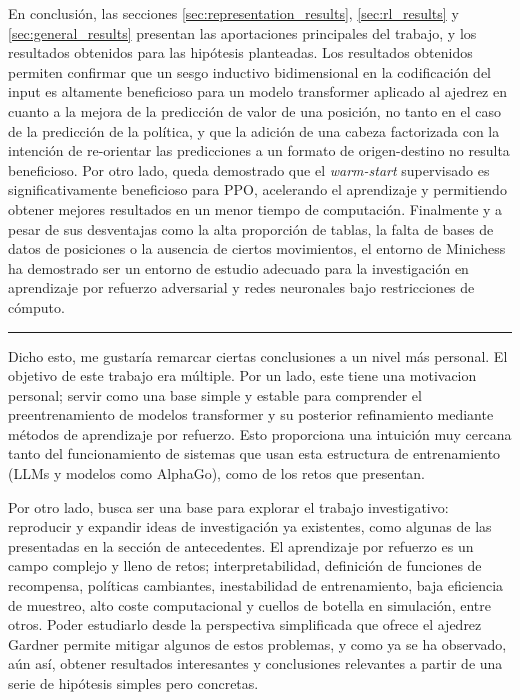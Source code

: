 \documentclass[12pt, a4paper]{article}
\begin{document}
En conclusión, las secciones \ref{sec:representation_results}, \ref{sec:rl_results} y \ref{sec:general_results} presentan las aportaciones principales del trabajo, y los resultados obtenidos para las hipótesis planteadas. Los resultados obtenidos permiten confirmar que un sesgo inductivo bidimensional en la codificación del input es altamente beneficioso para un modelo transformer aplicado al ajedrez en cuanto a la mejora de la predicción de valor de una posición, no tanto en el caso de la predicción de la política, y que la adición de una cabeza factorizada con la intención de re-orientar las predicciones a un formato de origen-destino no resulta beneficioso. Por otro lado, queda demostrado que el \textit{warm-start} supervisado es significativamente beneficioso para PPO, acelerando el aprendizaje y permitiendo obtener mejores resultados en un menor tiempo de computación. Finalmente y a pesar de sus desventajas como la alta proporción de tablas, la falta de bases de datos de posiciones o la ausencia de ciertos movimientos, el entorno de Minichess ha demostrado ser un entorno de estudio adecuado para la investigación en aprendizaje por refuerzo adversarial y redes neuronales bajo restricciones de cómputo. 

\rule{\textwidth}{0.2pt}

Dicho esto, me gustaría remarcar ciertas conclusiones a un nivel más personal. El objetivo de este trabajo era múltiple. Por un lado, este tiene una motivacion personal; servir como una base simple y estable para comprender el preentrenamiento de modelos transformer y su posterior refinamiento mediante métodos de aprendizaje por refuerzo. Esto proporciona una intuición muy cercana tanto del funcionamiento de sistemas que usan esta estructura de entrenamiento (LLMs y modelos como AlphaGo), como de los retos que presentan.

Por otro lado, busca ser una base para explorar el trabajo investigativo: reproducir y expandir ideas de investigación ya existentes, como algunas de las presentadas en la sección de antecedentes. El aprendizaje por refuerzo es un campo complejo y lleno de retos; interpretabilidad, definición de funciones de recompensa, políticas cambiantes, inestabilidad de entrenamiento, baja eficiencia de muestreo, alto coste computacional y cuellos de botella en simulación, entre otros. Poder estudiarlo desde la perspectiva simplificada que ofrece el ajedrez Gardner permite mitigar algunos de estos problemas, y como ya se ha observado, aún así, obtener resultados interesantes y conclusiones relevantes a partir de una serie de hipótesis simples pero concretas. 
\end{document}
